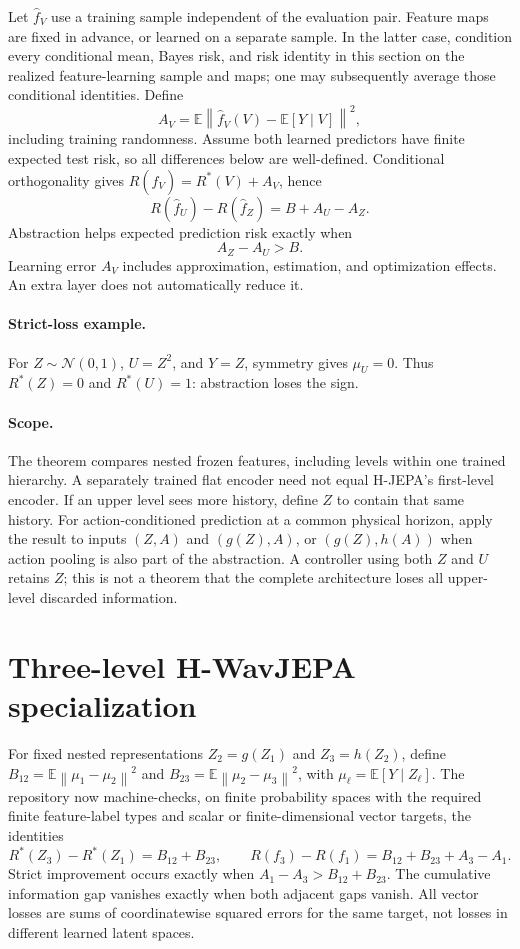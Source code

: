 \documentclass[11pt]{article}
\newcommand{\E}{\mathbb{E}}
\newcommand{\norm}[1]{\left\lVert #1\right\rVert}
\begin{document}
Let $\widehat f_V$ use a training sample independent of the evaluation pair. Feature maps are fixed in advance, or learned on a separate sample. In the latter case, condition every conditional mean, Bayes risk, and risk identity in this section on the realized feature-learning sample and maps; one may subsequently average those conditional identities. Define
\[
 A_V=\E\norm{\widehat f_V(V)-\E[Y\mid V]}^2,
\]
including training randomness. Assume both learned predictors have finite expected test risk, so all differences below are well-defined. Conditional orthogonality gives
$R(\widehat f_V)=R^*(V)+A_V$, hence
\begin{equation}
 \boxed{R(\widehat f_U)-R(\widehat f_Z)=B+A_U-A_Z.}
 \label{eq:central}
\end{equation}
Abstraction helps expected prediction risk exactly when
\[
 \boxed{A_Z-A_U>B.}
\]
Learning error $A_V$ includes approximation, estimation, and optimization effects. An extra layer does not automatically reduce it.

\paragraph{Strict-loss example.}
For $Z\sim\mathcal N(0,1)$, $U=Z^2$, and $Y=Z$, symmetry gives $\mu_U=0$. Thus $R^*(Z)=0$ and $R^*(U)=1$: abstraction loses the sign.

\paragraph{Scope.}
The theorem compares nested frozen features, including levels within one trained hierarchy. A separately trained flat encoder need not equal H-JEPA's first-level encoder. If an upper level sees more history, define $Z$ to contain that same history. For action-conditioned prediction at a common physical horizon, apply the result to inputs $(Z,A)$ and $(g(Z),A)$, or $(g(Z),h(A))$ when action pooling is also part of the abstraction. A controller using both $Z$ and $U$ retains $Z$; this is not a theorem that the complete architecture loses all upper-level discarded information.

\section{Three-level H-WavJEPA specialization}
For fixed nested representations $Z_2=g(Z_1)$ and $Z_3=h(Z_2)$, define
$B_{12}=\E\norm{\mu_1-\mu_2}^2$ and
$B_{23}=\E\norm{\mu_2-\mu_3}^2$, with $\mu_\ell=\E[Y\mid Z_\ell]$.
The repository now machine-checks, on finite probability spaces with the
required finite feature-label types and scalar or finite-dimensional vector
targets, the identities
\[
 R^*(Z_3)-R^*(Z_1)=B_{12}+B_{23},\qquad
 R(f_3)-R(f_1)=B_{12}+B_{23}+A_3-A_1.
\]
Strict improvement occurs exactly when $A_1-A_3>B_{12}+B_{23}$.
The cumulative information gap vanishes exactly when both adjacent gaps
vanish. All vector losses are sums of coordinatewise squared errors for the
same target, not losses in different learned latent spaces.
\end{document}
